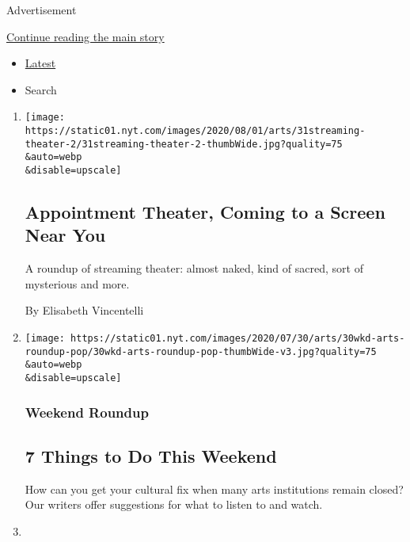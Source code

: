Advertisement

\protect\hyperlink{after-mid1}{Continue reading the main story}

\begin{itemize}
\tightlist
\item
  \protect\hyperlink{stream-panel}{Latest}
\item
  Search
\end{itemize}

\begin{enumerate}
\def\labelenumi{\arabic{enumi}.}
\item
  \href{/2020/07/30/theater/streaming-theater-online.html}{}

  \texttt{[image: https://static01.nyt.com/images/2020/08/01/arts/31streaming-theater-2/31streaming-theater-2-thumbWide.jpg?quality=75\\\&auto=webp\\\&disable=upscale]}

  \hypertarget{appointment-theater-coming-to-a-screen-near-you}{%
  \subsection{Appointment Theater, Coming to a Screen Near
  You}\label{appointment-theater-coming-to-a-screen-near-you}}

  A roundup of streaming theater: almost naked, kind of sacred, sort of
  mysterious and more.

  By Elisabeth Vincentelli
\item
  \href{/2020/07/30/arts/things-to-do-weekend-coronavirus.html}{}

  \texttt{[image: https://static01.nyt.com/images/2020/07/30/arts/30wkd-arts-roundup-pop/30wkd-arts-roundup-pop-thumbWide-v3.jpg?quality=75\\\&auto=webp\\\&disable=upscale]}

  \hypertarget{weekend-roundup}{%
  \subsubsection{Weekend Roundup}\label{weekend-roundup}}

  \hypertarget{7-things-to-do-this-weekend}{%
  \subsection{7 Things to Do This
  Weekend}\label{7-things-to-do-this-weekend}}

  How can you get your cultural fix when many arts institutions remain
  closed? Our writers offer suggestions for what to listen to and watch.
\item
  \href{/2020/07/28/arts/alan-menken-egot.html}{}


\end{enumerate}
